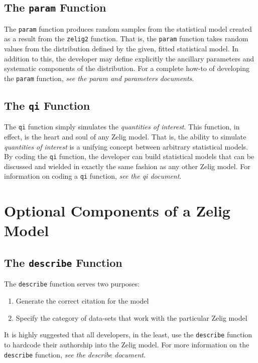 \documentclass[a4paper,10pt]{article}
\begin{document}
\subsection{The {\tt param} Function}
The {\tt param} function produces random samples from the statistical model created as a result from the {\tt zelig2} function.  That is, the {\tt param} function takes random values from the distribution defined by the given, fitted statistical model.  In addition to this, the developer may define explicitly the ancillary parameters and systematic components of the distribution.  For a complete how-to of developing the {\tt param} function, \emph{see the param and parameters documents}.

\subsection{The {\tt qi} Function}
The {\tt qi} function simply simulates the \emph{quantities of interest}.  This function, in effect, is the heart and soul of any Zelig model.  That is, the ability to simulate \emph{quantities of interest} is a unifying concept between arbitrary statistical models.  By coding the {\tt qi} function, the developer can build statistical models that can be discussed and wielded in exactly the same fashion as any other Zelig model.  For information on coding a {\tt qi} function, \emph{see the qi document}.

\section{Optional Components of a Zelig Model}

\subsection{The {\tt describe} Function}
The {\tt describe} function serves two purposes:
\begin{enumerate}
	\item{Generate the correct citation for the model}
	\item{Specify the category of data-sets that work with the particular Zelig model}
\end{enumerate}

It is highly suggested that all developers, in the least, use the {\tt describe} function to hardcode their authorship into the Zelig model.  For more information on the {\tt describe} function, \emph{see the describe document}.
\end{document}
